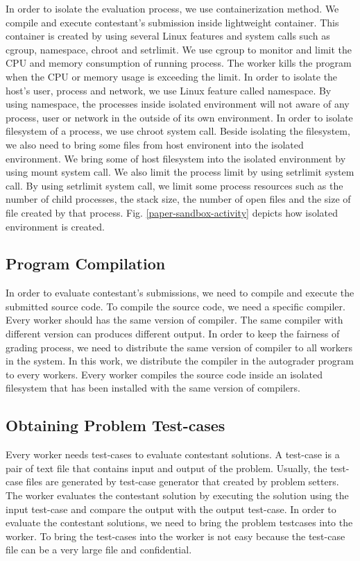 \documentclass[conference]{IEEEtran}
\begin{document}
In order to isolate the evaluation process, we use containerization method. We compile and execute contestant's submission inside lightweight container. This container is created by using several Linux features and system calls such as cgroup, namespace, chroot and setrlimit. We use cgroup to monitor and limit the CPU and memory consumption of running process. The worker kills the program when the CPU or memory usage is exceeding the limit. In order to isolate the host's user, process and network, we use Linux feature called namespace. By using namespace, the processes inside isolated environment will not aware of any process, user or network in the outside of its own environment. In order to isolate filesystem of a process, we use chroot system call. Beside isolating the filesystem, we also need to bring some files from host environent into the isolated environment. We bring some of host filesystem into the isolated environment by using mount system call. We also limit the process limit by using setrlimit system call. By using setrlimit system call, we limit some process resources such as the number of child processes, the stack size, the number of open files and the size of file created by that process. Fig. \ref{paper-sandbox-activity} depicts how isolated environment is created.

\subsection{Program Compilation}

In order to evaluate contestant's submissions, we need to compile and execute the submitted source code. To compile the source code, we need a specific compiler. Every worker should has the same version of compiler. The same compiler with different version can produces different output. In order to keep the fairness of grading process, we need to distribute the same version of compiler to all workers in the system. In this work, we distribute the compiler in the autograder program to every workers. Every worker compiles the source code inside an isolated filesystem that has been installed with the same version of compilers.

\subsection{Obtaining Problem Test-cases}

Every worker needs test-cases to evaluate contestant solutions. A test-case is a pair of text file that contains input and output of the problem. Usually, the test-case files are generated by test-case generator that created by problem setters. The worker evaluates the contestant solution by executing the solution using the input test-case and compare the output with the output test-case. In order to evaluate the contestant solutions, we need to bring the problem testcases into the worker. To bring the test-cases into the worker is not easy because the test-case file can be a very large file and confidential.
\end{document}
